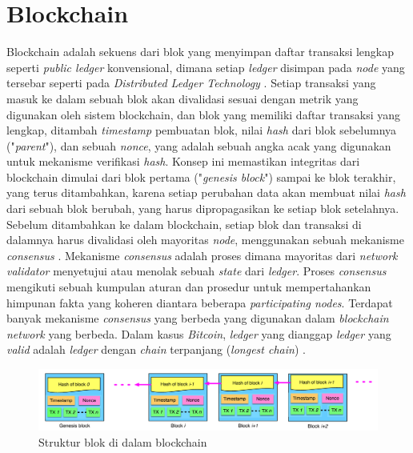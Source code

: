 \section{Blockchain}
\label{sec:blockchain}

Blockchain adalah sekuens dari blok yang menyimpan daftar transaksi lengkap seperti \textit{public ledger} konvensional, dimana setiap \textit{ledger} disimpan pada \textit{node} yang tersebar seperti pada \textit{Distributed Ledger Technology} \parencite{zheng2018blockchain}. Setiap transaksi yang masuk ke dalam sebuah blok akan divalidasi sesuai dengan metrik yang digunakan oleh sistem blockchain, dan blok yang memiliki daftar transaksi yang lengkap, ditambah \textit{timestamp} pembuatan blok, nilai \textit{hash} dari blok sebelumnya ("\textit{parent}"), dan sebuah \textit{nonce}, yang adalah sebuah angka acak yang digunakan untuk mekanisme verifikasi \textit{hash}. Konsep ini memastikan integritas dari blockchain dimulai dari blok pertama ("\textit{genesis block}") sampai ke blok terakhir, yang terus ditambahkan, karena setiap perubahan data akan membuat nilai \textit{hash} dari sebuah blok berubah, yang harus dipropagasikan ke setiap blok setelahnya. Sebelum ditambahkan ke dalam blockchain, setiap blok dan transaksi di dalamnya harus divalidasi oleh mayoritas \textit{node}, menggunakan sebuah mekanisme \textit{consensus} \parencite{nofer2017blockchain}. Mekanisme \textit{consensus} adalah proses dimana mayoritas dari \textit{network validator} menyetujui atau menolak sebuah \textit{state} dari \textit{ledger}. Proses \textit{consensus} mengikuti sebuah kumpulan aturan dan prosedur untuk mempertahankan himpunan fakta yang koheren diantara beberapa \textit{participating nodes}. Terdapat banyak mekanisme \textit{consensus} yang berbeda yang digunakan dalam \textit{blockchain network} yang berbeda. Dalam kasus \textit{Bitcoin}, \textit{ledger} yang dianggap \textit{ledger} yang \textit{valid} adalah \textit{ledger} dengan \textit{chain} terpanjang (\textit{longest chain}) \parencite{swanson2015consensus}.

\begin{figure}[ht]
	\centering
	\includegraphics[width=1\textwidth]{resources/chapter-2/struktur-blockchain.png}
	\caption{Struktur blok di dalam blockchain \parencite{zheng2018blockchain}}
	\label{image:struktur-blockchain}
\end{figure}

